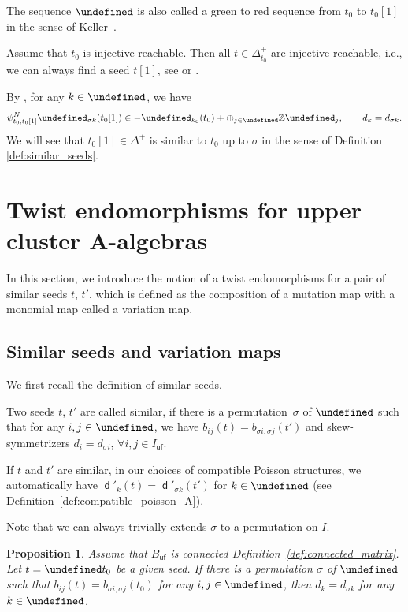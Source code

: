 \documentclass[10pt,a4paper]{amsart}
\newcommand{\Z}{\mathbb{Z}}
\newcommand{\opname}[1]{\operatorname{\mathsf{#1}}}
\newcommand{\diag}{{\delta}}
\renewcommand{\diag}{{d}}
\newcommand{\fv}{\opname{f}}
\newcommand{\ufv}{\opname{uf}}
\let\Iufv\undefined
\let\Ifv\undefined
\let\seq\undefined
\let\ff\undefined
\newcommand{\Iufv}{I_{\ufv}}
\newcommand{\Ifv}{I_{\fv}}
\renewcommand{\diag}{\opname{d}'}
\newcommand{\seq}{\boldsymbol{\mu}}%
\newcommand{\ff}{\mathbf{f}}
\numberwithin{equation}{section}
\newtheorem{Proposition}[Theorem]{Proposition}
 { \theoremstyle{definition}
\newtheorem{Definition}[Theorem]{Definition}
\newtheorem{Note}[Theorem]{Note}
\newtheorem{Example}[Theorem]{Example}
\newtheorem{Remark}[Theorem]{Remark}
\newtheorem{Assumption}[Theorem]{Assumption}
}
\begin{document}
The sequence $\seq$ is also called a green to red sequence from $t_{0}$
to $t_{0}[1]$ in the sense of Keller~\cite{keller2011cluster}.

Assume that $t_{0}$ is injective-reachable. Then all $t\in\Delta_{t_{0}}^{+}$
are injective-reachable, i.e., we can always find a seed $t[1]$, see
\cite[Proposition~5.1.4]{qin2017triangular} or \cite{muller2015existence}.

By \cite[Proposition~2.3.3]{qin2017triangular}, for any $k\in\Iufv$,
we have \[\psi_{t_{0},t_{0}[1]}^{N}\ff_{\sigma k}(t_{0}[1])\in-\ff_{k_{0}}(t_{0})+\oplus_{j\in\Ifv}\Z\ff_{j},\qquad d_{k}=d_{\sigma k}.\]
 We will see that $t_{0}[1]\in\Delta^{+}$ is similar
to $t_{0}$ up to $\sigma$ in the sense of Definition \ref{def:similar_seeds}.

\section[Twist endomorphisms for upper cluster A-algebras]{Twist endomorphisms for upper cluster $\boldsymbol{A}$-algebras}\label{sec:Twist-endomorphisms-A}

In this section, we introduce the notion of a twist endomorphisms
for a pair of similar seeds $t$, $t'$, which is defined as the composition
of a mutation map with a monomial map called a variation map.

\subsection{Similar seeds and variation maps}

We first recall the definition of similar seeds.

\begin{Definition}\label{def:similar_seeds}
Two seeds $t$, $t'$ are called similar, if there is a permutation~$\sigma$ of $\Iufv$ such that for any $i,j\in\Iufv$, we have $b_{ij}(t)=b_{\sigma i,\sigma j}(t')$
and skew-symmetrizers $d_{i}=d_{\sigma i}$, $\forall i,j\in I_{\ufv}$.
\end{Definition}
If $t$ and $t'$ are similar, in our choices of compatible Poisson structures, we automatically have $\diag_{k}(t)=\diag_{\sigma k}(t')$ for $k\in\Iufv$
(see Definition~\ref{def:compatible_poisson_A}).

Note that we can always trivially extends $\sigma$ to a permutation
on $I$.

\begin{Proposition}
Assume that $B_{\ufv}$ is connected Definition~{\rm \ref{def:connected_matrix}}.
Let $t=\seq t_{0}$ be a given seed. If there is a permutation $\sigma$
of $\Iufv$ such that $b_{ij}(t)=b_{\sigma i,\sigma j}(t_0)$ for any
$i,j\in\Iufv$, then $d_{k}=d_{\sigma k}$ for any $k\in\Iufv$.
\end{Proposition}
\end{document}
